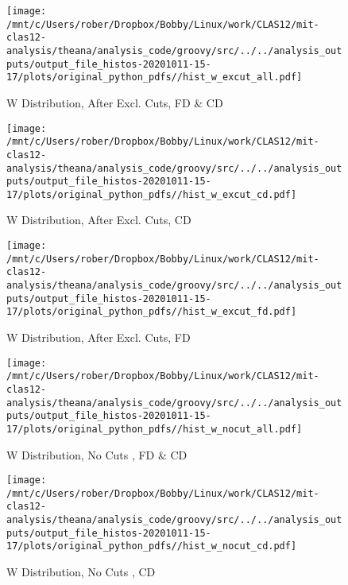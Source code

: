 \documentclass{article}
\begin{document}
\begin{landscape}
\begin{figure}[h]
        \texttt{[image: /mnt/c/Users/rober/Dropbox/Bobby/Linux/work/CLAS12/mit-clas12-analysis/theana/analysis\_code/groovy/src/../../analysis\_outputs/output\_file\_histos-20201011-15-17/plots/original\_python\_pdfs//hist\_w\_excut\_all.pdf]}
        \captionsetup{textformat=empty,labelformat=blank}
        \caption{W Distribution, After Excl. Cuts, FD \& CD}
    \end{figure}
    \clearpage
    
    \begin{figure}[h]
        \centering

        \texttt{[image: /mnt/c/Users/rober/Dropbox/Bobby/Linux/work/CLAS12/mit-clas12-analysis/theana/analysis\_code/groovy/src/../../analysis\_outputs/output\_file\_histos-20201011-15-17/plots/original\_python\_pdfs//hist\_w\_excut\_cd.pdf]}
        \captionsetup{textformat=empty,labelformat=blank}
        \caption{W Distribution, After Excl. Cuts, CD}
    \end{figure}
    \clearpage
    
    \begin{figure}[h]
        \centering

        \texttt{[image: /mnt/c/Users/rober/Dropbox/Bobby/Linux/work/CLAS12/mit-clas12-analysis/theana/analysis\_code/groovy/src/../../analysis\_outputs/output\_file\_histos-20201011-15-17/plots/original\_python\_pdfs//hist\_w\_excut\_fd.pdf]}
        \captionsetup{textformat=empty,labelformat=blank}
        \caption{W Distribution, After Excl. Cuts, FD}
    \end{figure}
    \clearpage
    
    \begin{figure}[h]
        \centering

        \texttt{[image: /mnt/c/Users/rober/Dropbox/Bobby/Linux/work/CLAS12/mit-clas12-analysis/theana/analysis\_code/groovy/src/../../analysis\_outputs/output\_file\_histos-20201011-15-17/plots/original\_python\_pdfs//hist\_w\_nocut\_all.pdf]}
        \captionsetup{textformat=empty,labelformat=blank}
        \caption{W Distribution, No Cuts , FD \& CD}
    \end{figure}
    \clearpage
    
    \begin{figure}[h]
        \centering

        \texttt{[image: /mnt/c/Users/rober/Dropbox/Bobby/Linux/work/CLAS12/mit-clas12-analysis/theana/analysis\_code/groovy/src/../../analysis\_outputs/output\_file\_histos-20201011-15-17/plots/original\_python\_pdfs//hist\_w\_nocut\_cd.pdf]}
        \captionsetup{textformat=empty,labelformat=blank}
        \caption{W Distribution, No Cuts , CD}
    \end{figure}
    \clearpage
    

\end{landscape}
\end{document}
